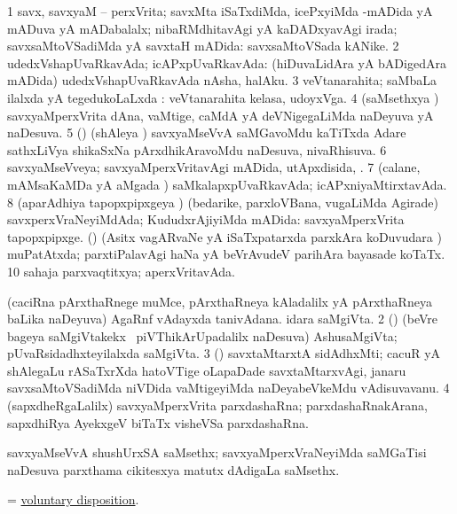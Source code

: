 \bentry 
{} 
\gl{\gu}
\expl{}
\bmng
\bnum
\num{1} savx, savxyaM -- perxVrita; savxMta iSaTxdiMda, icePxyiMda -mADida yA mADuva yA mADabalalx; nibaRMdhitavAgi yA kaDADxyavAgi irada; savxsaMtoVSadiMda yA savxtaH mADida:  savxsaMtoVSada kANike. 
\num{2} udedxVshapUvaRkavAda; icAPxpUvaRkavAda:  (hiDuvaLidAra yA bADigedAra mADida) udedxVshapUvaRkavAda nAsha, halAku. 
\num{3} veVtanarahita; saMbaLa ilalxda yA tegedukoLaLxda :  veVtanarahita kelasa, udoyxVga. 
\num{4} (saMsethxya \vi) savxyaMperxVrita dAna, vaMtige, caMdA yA deVNigegaLiMda naDeyuva yA naDesuva. 
\num{5} (\birx) (shAleya \vi) savxyaMseVvA saMGavoMdu kaTiTxda Adare sathxLiVya shikaSxNa pArxdhikAravoMdu naDesuva, nivaRhisuva. 
\num{6} savxyaMseVveya; savxyaMperxVritavAgi mADida, utApxdisida, \mo. 
\num{7} (calane, mAMsaKaMDa yA aMgada \vi) saMkalapxpUvaRkavAda; icAPxniyaMtirxtavAda. 
\num{8} (aparAdhiya tapopxpipxgeya \vi) (bedarike, parxloVBana, \mo vugaLiMda Agirade) savxperxVraNeyiMdAda; KududxrAjiyiMda mADida:  savxyaMperxVrita tapopxpipxge. (\nAyxshA) (Asitx vagARvaNe yA iSaTxpatarxda parxkAra koDuvudara \vi) muPatAtxda; parxtiPalavAgi haNa yA beVrAvudeV parihAra bayasade koTaTx. 
\num{10} sahaja parxvaqtitxya; aperxVritavAda. 
\enum
\emng
\eentry

\bentry 
{} 
\gl{\nA}
\bmng
\bnum
{} 
\banum
{} (caciRna pArxthaRnege muMce, pArxthaRneya kAladalilx yA pArxthaRneya baLika naDeyuva) AgaRnf vAdayxda tanivAdana. 
 idara saMgiVta. 
\eanum
\numie
\num{2} (\pArxparx) (beVre bageya saMgiVtakekx \kanmu\ piVThikArUpadalilx naDesuva) AshusaMgiVta; pUvaRsidadhxteyilalxda saMgiVta. 
\num{3} (\ca) savxtaMtarxtA sidAdhxMti; cacuR yA shAlegaLu rASaTxrXda hatoVTige oLapaDade savxtaMtarxvAgi, janaru savxsaMtoVSadiMda niVDida vaMtigeyiMda naDeyabeVkeMdu vAdisuvavanu. 
\num{4} (sapxdheRgaLalilx) savxyaMperxVrita parxdashaRna; parxdashaRnakArana, sapxdhiRya AyekxgeV biTaTx visheVSa parxdashaRna. 
\enum
\emng
\eentry
 
\bentry
{}
\gl{\nA}
\expl{}
\bmng
 savxyaMseVvA shushUrxSA saMsethx; savxyaMperxVraNeyiMda saMGaTisi naDesuva parxthama cikitesxya matutx dAdigaLa saMsethx. 
\emng
\eentry

\bentry 
{}
\gl{\nA}
\expl{}
\bmng
 = \hyperlink{voluntary disposition}{voluntary disposition}. 
\emng
\eentry

